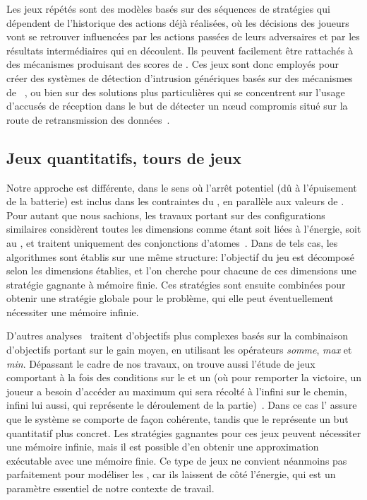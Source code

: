 Les jeux répétés sont des modèles basés sur des séquences de stratégies qui dépendent de l'historique des actions déjà réalisées, où les décisions des joueurs vont se retrouver influencées par les actions passées de leurs adversaires et par les résultats intermédiaires qui en découlent.
Ils peuvent facilement être rattachés à des mécanismes produisant des scores de \reput.
Ces jeux sont donc employés pour créer des systèmes de détection d'intrusion génériques basés sur des mécanismes de ~\cite{AD07}, ou bien sur des solutions plus particulières qui se concentrent sur l'usage d'accusés de réception dans le but de détecter un nœud compromis situé sur la route de retransmission des données~\cite{Red09}.

    \subsection{Jeux quantitatifs, tours de jeux}

Notre approche est différente, dans le sens où l'arrêt potentiel (dû à l'épuisement de la batterie) est inclus dans les contraintes du , en parallèle aux valeurs de .
Pour autant que nous sachions, les travaux portant sur des configurations similaires considèrent toutes les dimensions comme étant soit liées à l'énergie, soit au , et traitent uniquement des conjonctions d'atomes~\cite{chatterjee12,velner12a}.
Dans de tels cas, les algorithmes sont établis sur une même structure: l'objectif du jeu est décomposé selon les dimensions établies, et l'on cherche pour chacune de ces dimensions une stratégie gagnante à mémoire finie.
Ces stratégies sont ensuite combinées pour obtenir une stratégie globale pour le problème, qui elle peut éventuellement nécessiter une mémoire infinie.

D'autres analyses~\cite{velner12b} traitent d'objectifs plus complexes basés sur la combinaison d'objectifs portant sur le gain moyen, en utilisant les opérateurs \textit{somme}, \textit{max} et \textit{min}.
Dépassant le cadre de nos travaux, on trouve aussi l'étude de jeux comportant à la fois des conditions sur le  et un  (où pour remporter la victoire, un joueur a besoin d'accéder au  maximum qui sera récolté à l'infini sur le chemin, infini lui aussi, qui représente le déroulement de la partie)~\cite{chatterjee05}.
Dans ce cas l' assure que le système se comporte de façon cohérente, tandis que le  représente un but quantitatif plus concret.
Les stratégies gagnantes pour ces jeux peuvent nécessiter une mémoire infinie, mais il est possible d'en obtenir une approximation exécutable avec une mémoire finie.
Ce type de jeux ne convient néanmoins pas parfaitement pour modéliser les \rcs, car ils laissent de côté l'énergie, qui est un paramètre essentiel de notre contexte de travail.

